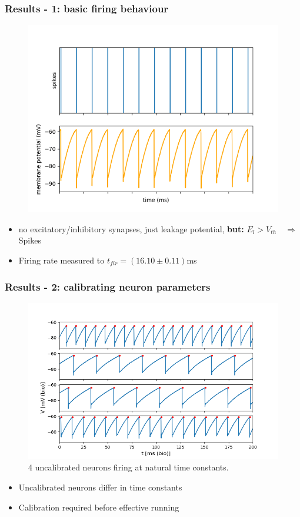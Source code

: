 \documentclass{beamer}
\begin{document}
\begin{frame}
    \frametitle{Results - 1: basic firing behaviour}
    \begin{figure}
    		\centering
    		\includegraphics[width=0.6\linewidth]{figures/fp_task1_1membrane.png}
    \end{figure}

    \begin{itemize}
    		\item no excitatory/inhibitory synapses,  just leakage potential,
    		\textbf{but: } $E_l>V_{th}\quad \Rightarrow$ Spikes
    		\item Firing rate measured to $t_{fir} = (16.10\pm 0.11)$ms
    \end{itemize}
\end{frame}

\begin{frame}
    \frametitle{Results - 2: calibrating neuron parameters}
    \begin{figure}
        \includegraphics[width=.7\textwidth]{figures/4membranes.png}
        \caption{4 uncalibrated neurons firing at natural time constants.}
    \end{figure}
    \begin{itemize}
        \item Uncalibrated neurons differ in time constants
        \item Calibration required before effective running
    \end{itemize}
\end{frame}
\end{document}
